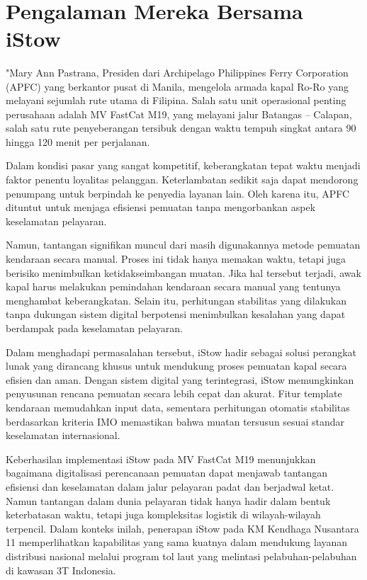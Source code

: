 {
\\
}

\section{Pengalaman Mereka Bersama iStow}
\label{sec:iStow-sebagai-solusi}

"Mary Ann Pastrana, Presiden dari Archipelago Philippines Ferry Corporation (APFC) yang berkantor pusat di Manila, mengelola armada kapal Ro-Ro yang melayani sejumlah rute utama di Filipina. Salah satu unit operasional penting perusahaan adalah MV FastCat M19, yang melayani jalur Batangas – Calapan, salah satu rute penyeberangan tersibuk dengan waktu tempuh singkat antara 90 hingga 120 menit per perjalanan.

Dalam kondisi pasar yang sangat kompetitif, keberangkatan tepat waktu menjadi faktor penentu loyalitas pelanggan. Keterlambatan sedikit saja dapat mendorong penumpang untuk berpindah ke penyedia layanan lain. Oleh karena itu, APFC dituntut untuk menjaga efisiensi pemuatan tanpa mengorbankan aspek keselamatan pelayaran.

Namun, tantangan signifikan muncul dari masih digunakannya metode pemuatan kendaraan secara manual. Proses ini tidak hanya memakan waktu, tetapi juga berisiko menimbulkan ketidakseimbangan muatan. Jika hal tersebut terjadi, awak kapal harus melakukan pemindahan kendaraan secara manual yang tentunya menghambat keberangkatan. Selain itu, perhitungan stabilitas yang dilakukan tanpa dukungan sistem digital berpotensi menimbulkan kesalahan yang dapat berdampak pada keselamatan pelayaran.

Dalam menghadapi permasalahan tersebut, iStow hadir sebagai solusi perangkat lunak yang dirancang khusus untuk mendukung proses pemuatan kapal secara efisien dan aman. Dengan sistem digital yang terintegrasi, iStow memungkinkan penyusunan rencana pemuatan secara lebih cepat dan akurat. Fitur template kendaraan memudahkan input data, sementara perhitungan otomatis stabilitas berdasarkan kriteria IMO memastikan bahwa muatan tersusun sesuai standar keselamatan internasional.

Keberhasilan implementasi iStow pada MV FastCat M19 menunjukkan bagaimana digitalisasi perencanaan pemuatan dapat menjawab tantangan efisiensi dan keselamatan dalam jalur pelayaran padat dan berjadwal ketat. Namun tantangan dalam dunia pelayaran tidak hanya hadir dalam bentuk keterbatasan waktu, tetapi juga kompleksitas logistik di wilayah-wilayah terpencil. Dalam konteks inilah, penerapan iStow pada KM Kendhaga Nusantara 11 memperlihatkan kapabilitas yang sama kuatnya dalam mendukung layanan distribusi nasional melalui program tol laut yang melintasi pelabuhan-pelabuhan di kawasan 3T Indonesia.

